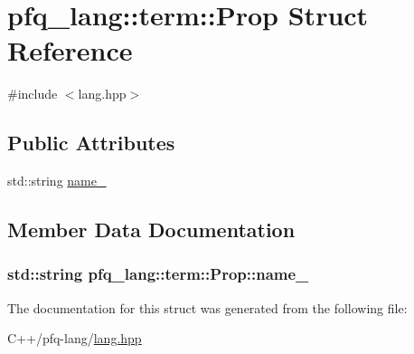 \hypertarget{structpfq__lang_1_1term_1_1Prop}{\section{pfq\+\_\+lang\+:\+:term\+:\+:Prop Struct Reference}
\label{structpfq__lang_1_1term_1_1Prop}
}


{\ttfamily \#include $<$lang.\+hpp$>$}

\subsection*{Public Attributes}
\begin{DoxyCompactItemize}
\item 
std\+::string \hyperlink{structpfq__lang_1_1term_1_1Prop_acd5fa0f8edef688fe2f042557ae0056b}{name\+\_\+}
\end{DoxyCompactItemize}


\subsection{Member Data Documentation}
\hypertarget{structpfq__lang_1_1term_1_1Prop_acd5fa0f8edef688fe2f042557ae0056b}{
\subsubsection[{name\+\_\+}]{\setlength{\rightskip}{0pt plus 5cm}std\+::string pfq\+\_\+lang\+::term\+::\+Prop\+::name\+\_\+}}\label{structpfq__lang_1_1term_1_1Prop_acd5fa0f8edef688fe2f042557ae0056b}


The documentation for this struct was generated from the following file\+:\begin{DoxyCompactItemize}
\item 
C++/pfq-\/lang/\hyperlink{lang_8hpp}{lang.\+hpp}\end{DoxyCompactItemize}
